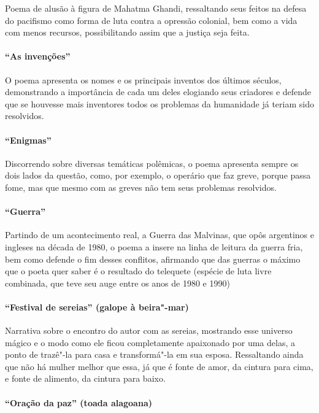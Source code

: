 Poema de alusão à figura de Mahatma Ghandi, ressaltando seus feitos na
defesa do pacifismo como forma de luta contra a opressão colonial, bem
como a vida com menos recursos, possibilitando assim que a justiça seja
feita.

\paragraph{``As invenções''}

O poema apresenta os nomes e os principais inventos dos últimos séculos,
demonstrando a importância de cada um deles elogiando seus criadores 
e defende que se houvesse mais inventores todos os
problemas da humanidade já teriam sido resolvidos.

\paragraph{``Enigmas''}

Discorrendo sobre diversas temáticas polêmicas, o poema apresenta sempre
os dois lados da questão, como, por exemplo, o operário que faz greve,
porque passa fome, mas que mesmo com as greves não tem seus problemas
resolvidos.

\paragraph{``Guerra''}

Partindo de um acontecimento real, a Guerra das Malvinas, que opôs
argentinos e ingleses na década de 1980, o poema a insere na linha de
leitura da guerra fria, bem como defende o fim desses conflitos,
afirmando que das guerras o máximo que o poeta quer saber é o resultado
do telequete (espécie de luta livre combinada, que teve seu auge entre
os anos de 1980 e 1990)

\paragraph{``Festival de sereias'' (galope à beira"-mar)}

Narrativa sobre o encontro do autor com as sereias, mostrando esse
universo mágico e o modo como ele ficou completamente apaixonado por
uma delas, a ponto de trazê"-la para casa e transformá"-la em sua esposa.
Ressaltando ainda que não há mulher melhor que essa, já que é fonte de
amor, da cintura para cima, e fonte de alimento, da cintura para baixo.

\paragraph{``Oração da paz'' (toada alagoana)}

